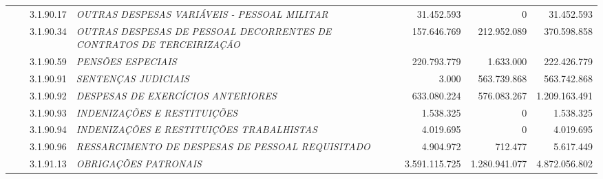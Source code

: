 \documentclass{article}
\begin{document}
\begin{longtable}[c]{m{0.1cm}m{0.1cm}m{0.8cm}|m{8cm}|m{2cm}|m{2cm}|m{2cm}}
\multicolumn{1}{l}{} & \multicolumn{1}{l}{} & \multicolumn{1}{l|}{3.1.90.17} & \multicolumn{1}{L{8cm}|}{\textit{OUTRAS DESPESAS VARIÁVEIS - PESSOAL MILITAR}} & \multicolumn{1}{r|}{31.452.593} & \multicolumn{1}{r|}{             0} &  \multicolumn{1}{r}{31.452.593}\\
\multicolumn{1}{l}{} & \multicolumn{1}{l}{} & \multicolumn{1}{l|}{3.1.90.34} & \multicolumn{1}{L{8cm}|}{\textit{OUTRAS DESPESAS DE PESSOAL DECORRENTES DE CONTRATOS DE TERCEIRIZAÇÃO}} & \multicolumn{1}{r|}{157.646.769} & \multicolumn{1}{r|}{212.952.089} &  \multicolumn{1}{r}{370.598.858}\\
\multicolumn{1}{l}{} & \multicolumn{1}{l}{} & \multicolumn{1}{l|}{3.1.90.59} & \multicolumn{1}{L{8cm}|}{\textit{PENSÕES ESPECIAIS}} & \multicolumn{1}{r|}{220.793.779} & \multicolumn{1}{r|}{1.633.000} &  \multicolumn{1}{r}{222.426.779}\\
\multicolumn{1}{l}{} & \multicolumn{1}{l}{} & \multicolumn{1}{l|}{3.1.90.91} & \multicolumn{1}{L{8cm}|}{\textit{SENTENÇAS JUDICIAIS}} & \multicolumn{1}{r|}{3.000} & \multicolumn{1}{r|}{563.739.868} &  \multicolumn{1}{r}{563.742.868}\\
\multicolumn{1}{l}{} & \multicolumn{1}{l}{} & \multicolumn{1}{l|}{3.1.90.92} & \multicolumn{1}{L{8cm}|}{\textit{DESPESAS DE EXERCÍCIOS ANTERIORES}} & \multicolumn{1}{r|}{633.080.224} & \multicolumn{1}{r|}{576.083.267} &  \multicolumn{1}{r}{1.209.163.491}\\
\multicolumn{1}{l}{} & \multicolumn{1}{l}{} & \multicolumn{1}{l|}{3.1.90.93} & \multicolumn{1}{L{8cm}|}{\textit{INDENIZAÇÕES E RESTITUIÇÕES}} & \multicolumn{1}{r|}{1.538.325} & \multicolumn{1}{r|}{             0} &  \multicolumn{1}{r}{1.538.325}\\
\multicolumn{1}{l}{} & \multicolumn{1}{l}{} & \multicolumn{1}{l|}{3.1.90.94} & \multicolumn{1}{L{8cm}|}{\textit{INDENIZAÇÕES E RESTITUIÇÕES TRABALHISTAS}} & \multicolumn{1}{r|}{4.019.695} & \multicolumn{1}{r|}{             0} &  \multicolumn{1}{r}{4.019.695}\\
\multicolumn{1}{l}{} & \multicolumn{1}{l}{} & \multicolumn{1}{l|}{3.1.90.96} & \multicolumn{1}{L{8cm}|}{\textit{RESSARCIMENTO DE DESPESAS DE PESSOAL REQUISITADO}} & \multicolumn{1}{r|}{4.904.972} & \multicolumn{1}{r|}{712.477} &  \multicolumn{1}{r}{5.617.449}\\
\multicolumn{1}{l}{} & \multicolumn{1}{l}{} & \multicolumn{1}{l|}{3.1.91.13} & \multicolumn{1}{L{8cm}|}{\textit{OBRIGAÇÕES PATRONAIS}} & \multicolumn{1}{r|}{3.591.115.725} & \multicolumn{1}{r|}{1.280.941.077} &  \multicolumn{1}{r}{4.872.056.802}\\

\end{longtable}
\end{document}
